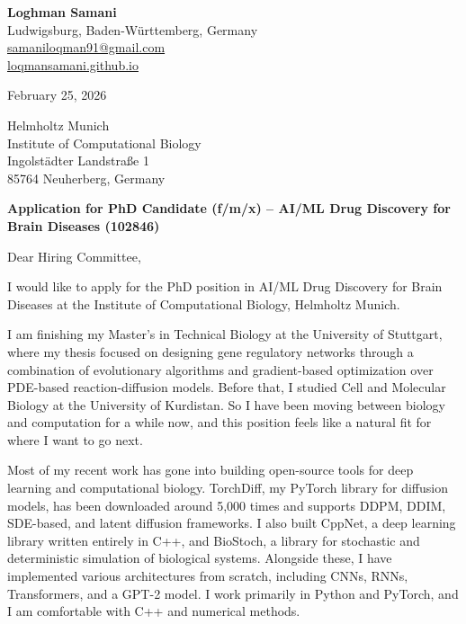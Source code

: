\documentclass[a4paper,11pt]{article}
\newcommand{\headerfontiii}{\fontfamily{ppl}\selectfont}
\begin{document}
\headerfontiii

\begin{flushleft}
\textbf{Loghman Samani} \\
Ludwigsburg, Baden-W\"urttemberg, Germany \\
\href{mailto:samaniloqman91@gmail.com}{samaniloqman91@gmail.com} \\
\href{https://loqmansamani.github.io}{loqmansamani.github.io}
\end{flushleft}

\vspace{4mm}

\begin{flushleft}
February 25, 2026
\end{flushleft}

\vspace{4mm}

\begin{flushleft}
Helmholtz Munich \\
Institute of Computational Biology \\
Ingolst\"adter Landstra\ss e 1 \\
85764 Neuherberg, Germany
\end{flushleft}

\vspace{4mm}

\textbf{Application for PhD Candidate (f/m/x) -- AI/ML Drug Discovery for Brain Diseases (102846)}

\vspace{4mm}

Dear Hiring Committee,

I would like to apply for the PhD position in AI/ML Drug Discovery for Brain Diseases at the Institute of Computational Biology, Helmholtz Munich.

I am finishing my Master's in Technical Biology at the University of Stuttgart, where my thesis focused on designing gene regulatory networks through a combination of evolutionary algorithms and gradient-based optimization over PDE-based reaction-diffusion models. Before that, I studied Cell and Molecular Biology at the University of Kurdistan. So I have been moving between biology and computation for a while now, and this position feels like a natural fit for where I want to go next.

Most of my recent work has gone into building open-source tools for deep learning and computational biology. TorchDiff, my PyTorch library for diffusion models, has been downloaded around 5,000 times and supports DDPM, DDIM, SDE-based, and latent diffusion frameworks. I also built CppNet, a deep learning library written entirely in C++, and BioStoch, a library for stochastic and deterministic simulation of biological systems. Alongside these, I have implemented various architectures from scratch, including CNNs, RNNs, Transformers, and a GPT-2 model. I work primarily in Python and PyTorch, and I am comfortable with C++ and numerical methods.
\end{document}
